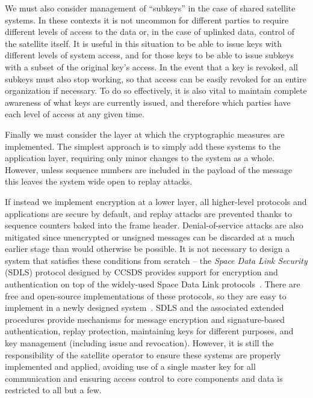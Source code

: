 We must also consider management of ``subkeys'' in the case of shared satellite systems.
In these contexts it is not uncommon for different parties to require different levels of access to the data or, in the case of uplinked data, control of the satellite itself.
It is useful in this situation to be able to issue keys with different levels of system access, and for those keys to be able to issue subkeys with a subset of the original key's access.
In the event that a key is revoked, all subkeys must also stop working, so that access can be easily revoked for an entire organization if necessary.
To do so effectively, it is also vital to maintain complete awareness of what keys are currently issued, and therefore which parties have each level of access at any given time.

Finally we must consider the layer at which the cryptographic measures are implemented.
The simplest approach is to simply add these systems to the application layer, requiring only minor changes to the system as a whole.
However, unless sequence numbers are included in the payload of the message this leaves the system wide open to replay attacks.

If instead we implement encryption at a lower layer, all higher-level protocols and applications are secure by default, and replay attacks are prevented thanks to sequence counters baked into the frame header.
Denial-of-service attacks are also mitigated since unencrypted or unsigned messages can be discarded at a much earlier stage than would otherwise be possible.
It is not necessary to design a system that satisfies these conditions from scratch -- the \textit{Space Data Link Security} (SDLS) protocol designed by CCSDS provides support for encryption and authentication on top of the widely-used Space Data Link protocols~\cite{ccsdsSpace2015,ccsdsSpace2020}.
There are free and open-source implementations of these protocols, so they are easy to implement in a newly designed system~\cite{nasaCryptolib}.
SDLS and the associated extended procedures provide mechanisms for message encryption and signature-based authentication, replay protection, maintaining keys for different purposes, and key management (including issue and revocation).
However, it is still the responsibility of the satellite operator to ensure these systems are properly implemented and applied, avoiding use of a single master key for all communication and ensuring access control to core components and data is restricted to all but a few.

